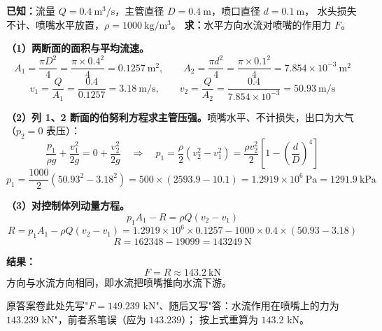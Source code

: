
\begin{jie}
\textbf{已知：}流量 $Q=0.4\ \mathrm{m^3/s}$，主管直径 $D=0.4\ \mathrm{m}$，喷口直径 $d=0.1\ \mathrm{m}$，
水头损失不计、喷嘴水平放置，$\rho=1000\ \mathrm{kg/m^3}$。
\textbf{求：}水平方向水流对喷嘴的作用力 $F$。


\textbf{（1）两断面的面积与平均流速。}
\[
A_1=\frac{\pi D^2}{4}=\frac{\pi\times0.4^2}{4}=0.1257\ \mathrm{m^2},
\qquad
A_2=\frac{\pi d^2}{4}=\frac{\pi\times0.1^2}{4}=7.854\times10^{-3}\ \mathrm{m^2}
\]
\[
v_1=\frac{Q}{A_1}=\frac{0.4}{0.1257}=3.18\ \mathrm{m/s},
\qquad
v_2=\frac{Q}{A_2}=\frac{0.4}{7.854\times10^{-3}}=50.93\ \mathrm{m/s}
\]

\textbf{（2）列 1、2 断面的伯努利方程求主管压强。}喷嘴水平、不计损失，出口为大气（$p_2=0$ 表压）：
\[
\frac{p_1}{\rho g}+\frac{v_1^2}{2g}=0+\frac{v_2^2}{2g}
\quad\Longrightarrow\quad
p_1=\frac{\rho}{2}\left(v_2^2-v_1^2\right)=\frac{\rho v_2^2}{2}\left[1-\left(\frac{d}{D}\right)^4\right]
\]
\[
p_1=\frac{1000}{2}\left(50.93^2-3.18^2\right)=500\times\left(2593.9-10.1\right)=1.2919\times10^6\ \mathrm{Pa}=1291.9\ \mathrm{kPa}
\]

\textbf{（3）对控制体列动量方程。}
\[
p_1A_1-R=\rho Q\left(v_2-v_1\right)
\]
\[
R=p_1A_1-\rho Q\left(v_2-v_1\right)
=1.2919\times10^6\times0.1257-1000\times0.4\times\left(50.93-3.18\right)
\]
\[
R=162348-19099=143249\ \mathrm{N}
\]

\textbf{结果：}
\[
\boxed{F=R\approx143.2\ \mathrm{kN}}
\]
方向与水流方向相同，即水流把喷嘴推向水流下游。
\end{jie}

\begin{tishi}
原答案卷此处先写"$F=149.239$ kN"、随后又写"答：水流作用在喷嘴上的力为 $143.239$ kN"，前者系笔误（应为 $143.239$）；
按上式重算为 $143.2$ kN。
\end{tishi}


